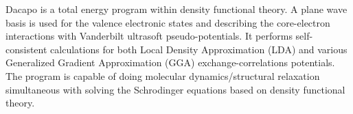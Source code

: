 Dacapo is a total energy program within density functional theory. A plane wave basis is used for the valence electronic states and describing the core-electron interactions with Vanderbilt ultrasoft pseudo-potentials. It performs self-consistent calculations for both Local Density Approximation (LDA) and various Generalized Gradient Approximation (GGA) exchange-correlations potentials. The program is capable of doing molecular dynamics/structural relaxation simultaneous with solving the Schrodinger equations based on density functional theory.


